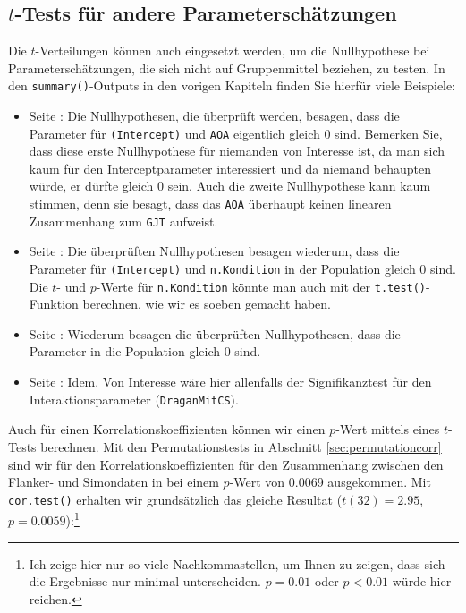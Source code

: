 \documentclass[oneside, 10pt]{book}\usepackage[]{graphicx}\usepackage[]{xcolor}
\begin{document}
% 
\subsection{$t$-Tests für andere Parameterschätzungen}
Die $t$-Verteilungen können auch eingesetzt werden, um
die Nullhypothese bei Parameterschätzungen,
die sich nicht auf Gruppenmittel beziehen, zu testen.
In den \texttt{summary()}-Outputs in
den vorigen Kapiteln finden Sie hierfür viele Beispiele:

\begin{itemize}
 \item Seite \pageref{sec:aoa}: Die Nullhypothesen, die überprüft werden, besagen, dass die Parameter für \texttt{(Intercept)} und \texttt{AOA} eigentlich gleich 0 sind. Bemerken Sie, dass diese erste Nullhypothese für niemanden von Interesse ist, da man sich kaum für den Interceptparameter interessiert und da niemand behaupten würde, er dürfte gleich 0 sein.
 Auch die zweite Nullhypothese kann kaum stimmen, denn sie besagt, dass das \texttt{AOA}
 überhaupt keinen linearen Zusammenhang zum \texttt{GJT} aufweist.

 \item Seite \pageref{sec:money}: Die überprüften Nullhypothesen besagen wiederum, dass die Parameter für \texttt{(Intercept)} und \texttt{n.Kondition} in der Population gleich 0 sind.
 Die $t$- und $p$-Werte für \texttt{n.Kondition} könnte man auch
 mit der \texttt{t.test()}-Funktion berechnen,
 wie wir es soeben gemacht haben.

 \item Seite \pageref{sec:strategy}:
 Wiederum besagen die überprüften Nullhypothesen,
 dass die Parameter in die Population gleich 0 sind.

 \item Seite \pageref{sec:dragan}: Idem.
 Von Interesse wäre hier allenfalls der Signifikanztest
 für den Interaktionsparameter (\texttt{DraganMitCS}).

\end{itemize}

Auch für einen Korrelationskoeffizienten können wir einen $p$-Wert
mittels eines $t$-Tests berechnen. Mit den Permutationstests in Abschnitt
\vref{sec:permutationcorr} sind wir für den Korrelationskoeffizienten
für den Zusammenhang zwischen den Flanker- und Simondaten in \citet{Poarch2018}
bei einem $p$-Wert von 0.0069 ausgekommen. Mit \texttt{cor.test()}
erhalten wir grundsätzlich das gleiche Resultat ($t(32) = 2.95$, $p = 0.0059$):\footnote{Ich zeige hier nur so viele Nachkommastellen, um Ihnen zu zeigen, dass sich die Ergebnisse nur minimal unterscheiden. $p = 0.01$ oder $p < 0.01$ würde hier reichen.}
\end{document}
